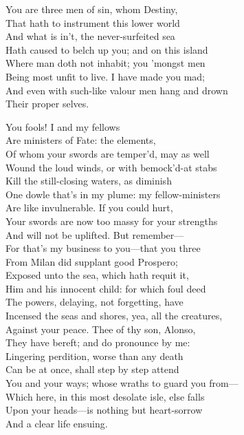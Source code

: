 \begin{verse_speech}[Ariel] 
You are three men of sin, whom Destiny,\\
That hath to instrument this lower world\\
And what is in't, the never-surfeited sea\\
Hath caused to belch up you; and on this island\\
Where man doth not inhabit; you 'mongst men\\
Being most unfit to live. I have made you mad;\\
And even with such-like valour men hang and drown\\
Their proper selves.


You fools! I and my fellows\\
Are ministers of Fate: the elements,\\
Of whom your swords are temper'd, may as well\\
Wound the loud winds, or with bemock'd-at stabs\\
Kill the still-closing waters, as diminish\\
One dowle that's in my plume: my fellow-ministers\\
Are like invulnerable. If you could hurt,\\
Your swords are now too massy for your strengths\\
And will not be uplifted. But remember—\\
For that's my business to you—that you three\\
From Milan did supplant good Prospero;\\
Exposed unto the sea, which hath requit it,\\
Him and his innocent child: for which foul deed\\
The powers, delaying, not forgetting, have\\
Incensed the seas and shores, yea, all the creatures,\\
Against your peace. Thee of thy son, Alonso,\\
They have bereft; and do pronounce by me:\\
Lingering perdition, worse than any death\\
Can be at once, shall step by step attend\\
You and your ways; whose wraths to guard you from—\\
Which here, in this most desolate isle, else falls\\
Upon your heads—is nothing but heart-sorrow\\
And a clear life ensuing.
\end{verse_speech}


